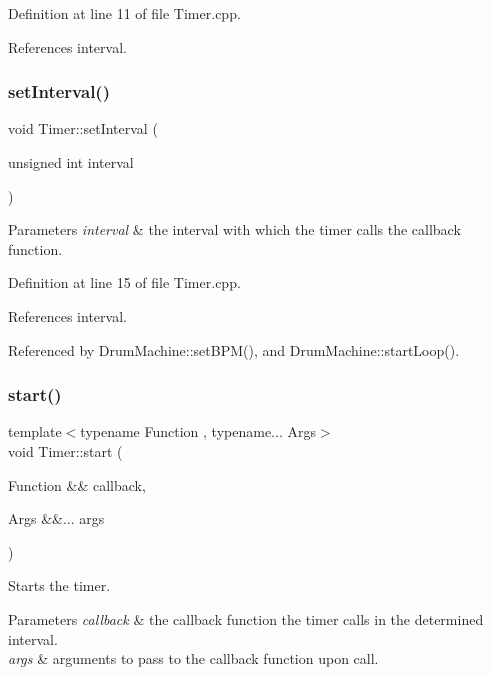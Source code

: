 Definition at line 11 of file Timer.\+cpp.



References interval.

\mbox{\label{class_timer_a0b24293bfc154f7432b1c52ac857d853}} 
\subsubsection{\texorpdfstring{set\+Interval()}{setInterval()}}
{\footnotesize\ttfamily void Timer\+::set\+Interval (\begin{DoxyParamCaption}\item[{unsigned int}]{interval }\end{DoxyParamCaption})}


\begin{DoxyParams}{Parameters}
{\em interval} & the interval with which the timer calls the callback function. \\
\hline
\end{DoxyParams}


Definition at line 15 of file Timer.\+cpp.



References interval.



Referenced by Drum\+Machine\+::set\+B\+P\+M(), and Drum\+Machine\+::start\+Loop().

\mbox{\label{class_timer_adcf70b5065e31461e27309c96065437a}} 
\subsubsection{\texorpdfstring{start()}{start()}}
{\footnotesize\ttfamily template$<$typename Function , typename... Args$>$ \\
void Timer\+::start (\begin{DoxyParamCaption}\item[{Function \&\&}]{callback,  }\item[{Args \&\&...}]{args }\end{DoxyParamCaption})\hspace{0.3cm}{\ttfamily [inline]}}

Starts the timer. 
\begin{DoxyParams}{Parameters}
{\em callback} & the callback function the timer calls in the determined interval. \\
\hline
{\em args} & arguments to pass to the callback function upon call. \\
\hline
\end{DoxyParams}


